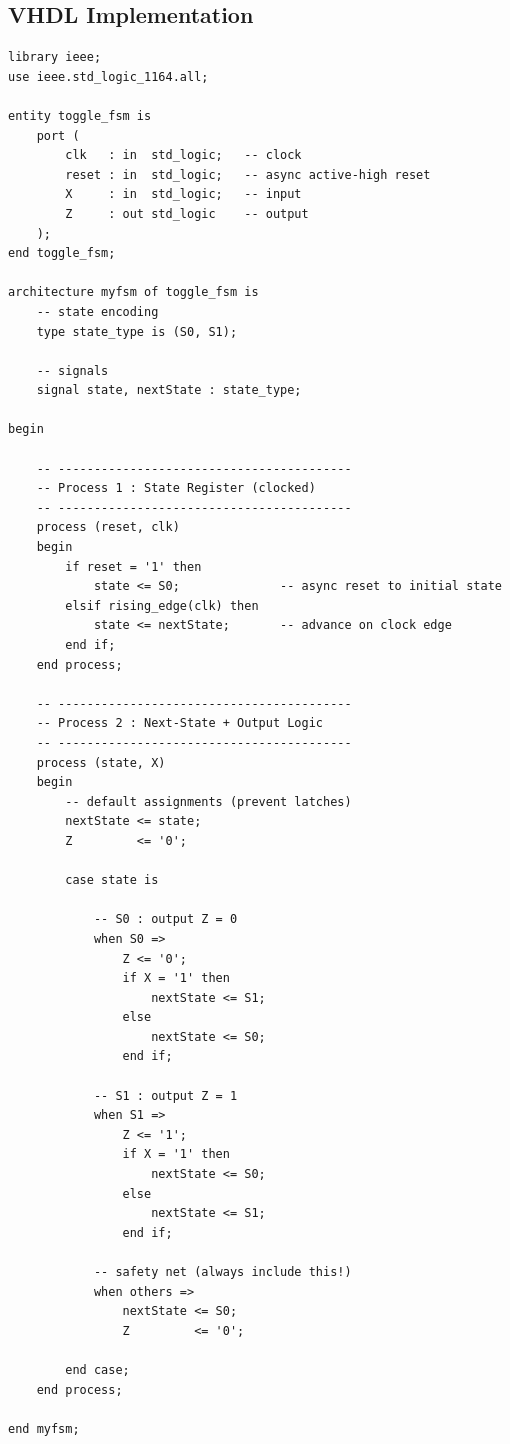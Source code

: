 \documentclass[12pt,a4paper]{article}
\begin{document}
\subsection{VHDL Implementation}

\begin{tcolorbox}[vhdlbox, title={Level 1 --- toggle\_fsm.vhd}]
\begin{lstlisting}[style=vhdlstyle]
library ieee;
use ieee.std_logic_1164.all;

entity toggle_fsm is
    port (
        clk   : in  std_logic;   -- clock
        reset : in  std_logic;   -- async active-high reset
        X     : in  std_logic;   -- input
        Z     : out std_logic    -- output
    );
end toggle_fsm;

architecture myfsm of toggle_fsm is
    -- state encoding
    type state_type is (S0, S1);

    -- signals
    signal state, nextState : state_type;

begin

    -- -----------------------------------------
    -- Process 1 : State Register (clocked)
    -- -----------------------------------------
    process (reset, clk)
    begin
        if reset = '1' then
            state <= S0;              -- async reset to initial state
        elsif rising_edge(clk) then
            state <= nextState;       -- advance on clock edge
        end if;
    end process;

    -- -----------------------------------------
    -- Process 2 : Next-State + Output Logic
    -- -----------------------------------------
    process (state, X)
    begin
        -- default assignments (prevent latches)
        nextState <= state;
        Z         <= '0';

        case state is

            -- S0 : output Z = 0
            when S0 =>
                Z <= '0';
                if X = '1' then
                    nextState <= S1;
                else
                    nextState <= S0;
                end if;

            -- S1 : output Z = 1
            when S1 =>
                Z <= '1';
                if X = '1' then
                    nextState <= S0;
                else
                    nextState <= S1;
                end if;

            -- safety net (always include this!)
            when others =>
                nextState <= S0;
                Z         <= '0';

        end case;
    end process;

end myfsm;
\end{lstlisting}
\end{tcolorbox}
\end{document}
